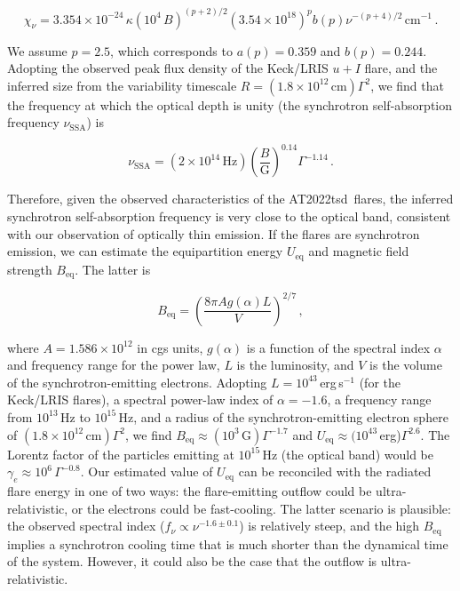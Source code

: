 \documentclass{nature_plusfigure}
\newcommand{\at}{AT2022tsd}
\begin{document}
\begin{methods}
\begin{equation}
\label{eq:synchrotron-tau}
\chi_\nu = 3.354\times10^{-24}\, \kappa (10^4\,B)^{(p+2)/2} (3.54\times10^{18})^p b(p) \nu^{-(p+4)/2}\,\mathrm{cm}^{-1}\, .
\end{equation}

We assume $p=2.5$, which corresponds to\cite{Longair2011} $a(p)=0.359$ and $b(p)=0.244$. Adopting the observed peak flux density of the Keck/LRIS $u+I$ flare, and the inferred size from the variability timescale $R=(1.8\times10^{12}\,\mathrm{cm})\Gamma^2$, we find that the frequency at which the optical depth is unity (the synchrotron self-absorption frequency $\nu_\mathrm{SSA}$) is

\begin{equation}
\label{eq:ssa}
\nu_\mathrm{SSA} = (2\times10^{14}\,\mathrm{Hz}) \left(\frac{B}{\mathrm{G}} \right)^{0.14} \Gamma^{-1.14}\, .
\end{equation}

\noindent Therefore, given the observed characteristics of the \at\ flares, the inferred synchrotron self-absorption frequency is very close to the optical band, consistent with our observation of optically thin emission.
If the flares are synchrotron emission, we can  
estimate the equipartition energy $U_\mathrm{eq}$ and magnetic field strength $B_\mathrm{eq}$. The latter is

\begin{equation}
B_\mathrm{eq} = \left( \frac{8\pi A g(\alpha) L}{V} \right)^{2/7}\, ,
\end{equation}

\noindent where $A=1.586\times10^{12}$ in cgs units, $g(\alpha)$ is a function of the spectral index $\alpha$ and frequency range for the power law, $L$ is the luminosity, and $V$ is the volume of the synchrotron-emitting electrons. Adopting $L=10^{43}\,$erg\,s$^{-1}$ (for the Keck/LRIS flares), a spectral power-law index of $\alpha=-1.6$, a frequency range from $10^{13}$\,Hz to $10^{15}$\,Hz, and a radius of the synchrotron-emitting electron sphere of $(1.8\times10^{12}\,\mathrm{cm})\Gamma^2$, we find $B_\mathrm{eq}\approx(10^{3}\,\mathrm{G})\Gamma^{-1.7}$ and $U_\mathrm{eq}\approx(10^{43}\,$erg)$\Gamma^{2.6}$. The Lorentz factor of the particles emitting at $10^{15}$\,Hz (the optical band) would be $\gamma_e\approx10^{6}\, \Gamma^{-0.8}$.
Our estimated value of $U_\mathrm{eq}$ can be reconciled with the radiated flare energy in one of two ways: the flare-emitting outflow could be ultra-relativistic, or the electrons could be fast-cooling. The latter scenario is plausible: the observed spectral index ($f_\nu\propto\nu^{-1.6\pm0.1}$) is relatively steep, and the high $B_\mathrm{eq}$ implies a synchrotron cooling time that is much shorter than the dynamical time of the system. However, it could also be the case that the outflow is ultra-relativistic.


\end{methods}
\end{document}
